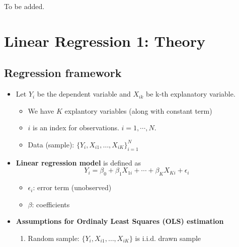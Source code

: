\documentclass[]{book}
\providecommand{\tightlist}{%
  \setlength{\itemsep}{0pt}\setlength{\parskip}{0pt}}
\begin{document}
To be added.

\chapter{Linear Regression 1: Theory}\label{linear-regression-1-theory}

\section{Regression framework}\label{regression-framework}

\begin{itemize}
\tightlist
\item
  Let \(Y_i\) be the dependent variable and \(X_{ik}\) be k-th
  explanatory variable.

  \begin{itemize}
  \tightlist
  \item
    We have \(K\) explantory variables (along with constant term)
  \item
    \(i\) is an index for observations. \(i = 1,\cdots, N\).
  \item
    Data (sample): \(\{ Y_i , X_{i1}, \ldots, X_{iK} \}_{i=1}^N\)
  \end{itemize}
\item
  \textbf{Linear regression model} is defined as
  \[ Y_{i}=\beta_{0}+\beta_{1}X_{1i}+\cdots+\beta_{K}X_{Ki}+\epsilon_{i} \]

  \begin{itemize}
  \tightlist
  \item
    \(\epsilon_i\): error term (unobserved)
  \item
    \(\beta\): coefficients
  \end{itemize}
\item
  \textbf{Assumptions for Ordinaly Least Squares (OLS) estimation}

  \begin{enumerate}
  \def\labelenumi{\arabic{enumi}.}
  \tightlist
  \item
    Random sample: \(\{ Y_i , X_{i1}, \ldots, X_{iK} \}\) is i.i.d.
    drawn sample


\end{enumerate}
\end{itemize}
\end{document}
